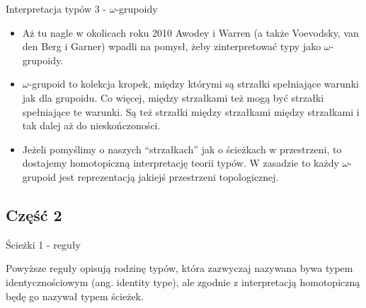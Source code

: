 \documentclass{beamer}
\begin{document}
\begin{frame}{Interpretacja typów 3 - $\omega$-grupoidy}
\begin{itemize}
	\item Aż tu nagle w okolicach roku 2010 Awodey i Warren (a także Voevodsky, van den Berg i Garner) wpadli na pomysł, żeby zinterpretować typy jako $\omega$-grupoidy.
	\item $\omega$-grupoid to kolekcja kropek, między którymi są strzałki spełniające warunki jak dla grupoidu. Co więcej, między strzałkami też mogą być strzałki spełniające te warunki. Są też strzałki między strzałkami między strzałkami i tak dalej aż do nieskończoności.
	\item Jeżeli pomyślimy o naszych ``strzałkach'' jak o ścieżkach w przestrzeni, to dostajemy homotopiczną interpretację teorii typów. W zasadzie to każdy $\omega$-grupoid jest reprezentacją jakiejś przestrzeni topologicznej.
\end{itemize}
\end{frame}

\subsection{Część 2}

\begin{frame}{Ścieżki 1 - reguły}


Powyższe reguły opisują rodzinę typów, która zazwyczaj nazywana bywa typem identycznościowym (ang. identity type), ale zgodnie z interpretacją homotopiczną będę go nazywał typem ścieżek.

\end{frame}
\end{document}
